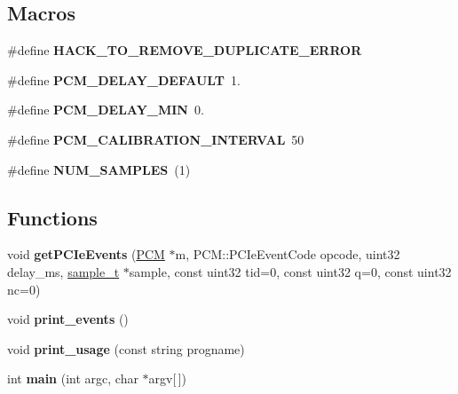 \subsection*{Macros}
\begin{DoxyCompactItemize}
\item 
\mbox{\label{pcm-pcie_8cpp_ac4eeb11d89b0f517835a12a04443ebe4}} 
\#define {\bfseries H\+A\+C\+K\+\_\+\+T\+O\+\_\+\+R\+E\+M\+O\+V\+E\+\_\+\+D\+U\+P\+L\+I\+C\+A\+T\+E\+\_\+\+E\+R\+R\+OR}
\item 
\mbox{\label{pcm-pcie_8cpp_aa9ecc55c90c7a69729babc4f5f91ed96}} 
\#define {\bfseries P\+C\+M\+\_\+\+D\+E\+L\+A\+Y\+\_\+\+D\+E\+F\+A\+U\+LT}~1.
\item 
\mbox{\label{pcm-pcie_8cpp_acccbe8441d6dd75bdc949f5f0ee126c5}} 
\#define {\bfseries P\+C\+M\+\_\+\+D\+E\+L\+A\+Y\+\_\+\+M\+IN}~0.
\item 
\mbox{\label{pcm-pcie_8cpp_a433dde946b6713059756318598c9a6fe}} 
\#define {\bfseries P\+C\+M\+\_\+\+C\+A\+L\+I\+B\+R\+A\+T\+I\+O\+N\+\_\+\+I\+N\+T\+E\+R\+V\+AL}~50
\item 
\mbox{\label{pcm-pcie_8cpp_af0b23eedf2352de4c1eff77e1401730c}} 
\#define {\bfseries N\+U\+M\+\_\+\+S\+A\+M\+P\+L\+ES}~(1)
\end{DoxyCompactItemize}
\subsection*{Functions}
\begin{DoxyCompactItemize}
\item 
\mbox{\label{pcm-pcie_8cpp_a6f6813e281e8e90956addc67737fa3c3}} 
void {\bfseries get\+P\+C\+Ie\+Events} (\mbox{\hyperlink{class_p_c_m}{P\+CM}} $\ast$m, P\+C\+M\+::\+P\+C\+Ie\+Event\+Code opcode, uint32 delay\+\_\+ms, \mbox{\hyperlink{structsample__t}{sample\+\_\+t}} $\ast$sample, const uint32 tid=0, const uint32 q=0, const uint32 nc=0)
\item 
\mbox{\label{pcm-pcie_8cpp_a3193d1a8ca2451055cda0dc7cb39b71d}} 
void {\bfseries print\+\_\+events} ()
\item 
\mbox{\label{pcm-pcie_8cpp_a4e43544978d9afb2faf08dce11cab70c}} 
void {\bfseries print\+\_\+usage} (const string progname)
\item 
\mbox{\label{pcm-pcie_8cpp_a0ddf1224851353fc92bfbff6f499fa97}} 
int {\bfseries main} (int argc, char $\ast$argv\mbox{[}$\,$\mbox{]})
\end{DoxyCompactItemize}
